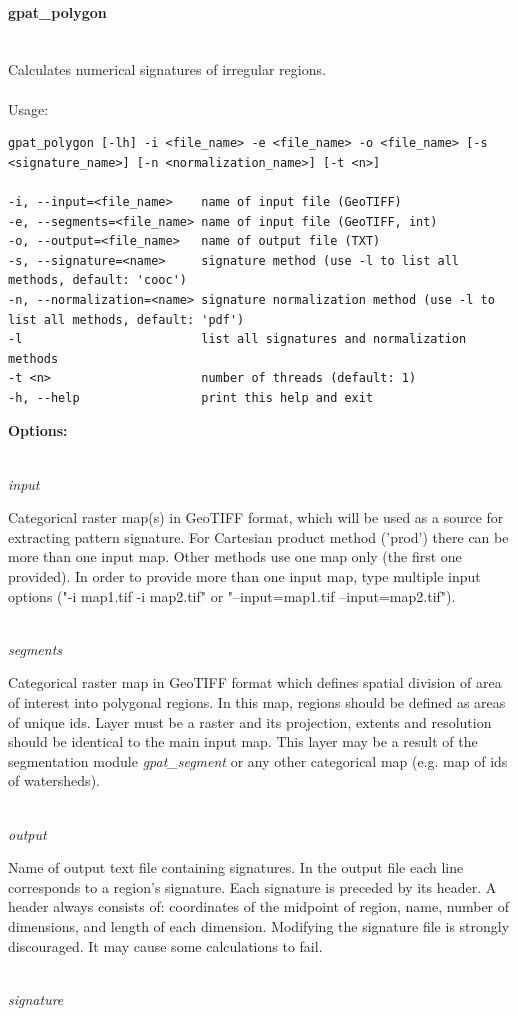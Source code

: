 \documentclass[12pt,margin=0.5in]{article}
\newcommand{\newparagraph}[1]{\paragraph{#1}\mbox{}\\}
\newcommand{\newoption}[1]{\mbox{}\\{\it #1}}
\begin{document}
\newparagraph{gpat\_polygon}
Calculates numerical signatures of irregular regions.
\\\\
Usage:
\begin{lstlisting}[frame=single]
gpat_polygon [-lh] -i <file_name> -e <file_name> -o <file_name> [-s <signature_name>] [-n <normalization_name>] [-t <n>]

-i, --input=<file_name>    name of input file (GeoTIFF)
-e, --segments=<file_name> name of input file (GeoTIFF, int)
-o, --output=<file_name>   name of output file (TXT)
-s, --signature=<name>     signature method (use -l to list all methods, default: 'cooc')
-n, --normalization=<name> signature normalization method (use -l to list all methods, default: 'pdf')
-l                         list all signatures and normalization methods
-t <n>                     number of threads (default: 1)
-h, --help                 print this help and exit
\end{lstlisting}

{\bf Options:}

\newoption{input}

Categorical raster map(s) in GeoTIFF format, which will be used as a source for extracting pattern signature. For Cartesian product method ('prod') there can be more than one input map. Other methods use one map only (the first one provided). In order to provide more than one input map, type multiple input options ("-i map1.tif -i map2.tif" or "--input=map1.tif --input=map2.tif").

\newoption{segments}

Categorical raster map in GeoTIFF format which defines spatial division of area of interest into polygonal regions. In this map, regions should be defined as areas of unique ids. Layer must be a raster and its projection, extents and resolution should be identical to the main input map. This layer may be a result of the segmentation module {\it gpat\_segment} or any other categorical map (e.g. map of ids of watersheds).

\newoption{output}

Name of output text file containing signatures. In the output file each line corresponds to a region's signature. Each signature is preceded by its header. A header always consists of: coordinates of the midpoint of region, name, number of dimensions, and length of each dimension. Modifying the signature file is strongly discouraged. It may cause some calculations to fail.

\newoption{signature}
\end{document}

